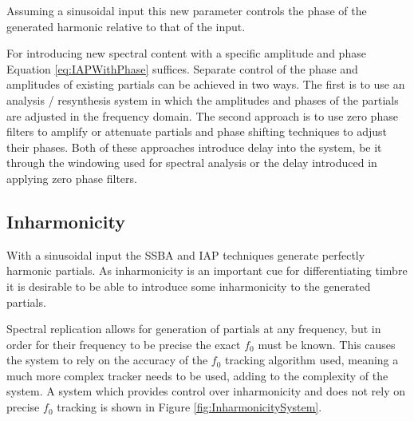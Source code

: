 		Assuming a sinusoidal input this new parameter controls the phase of the generated harmonic relative to
		that of the input. 
		
		For introducing new spectral content with a specific amplitude and phase Equation \ref{eq:IAPWithPhase}
		suffices. Separate control of the phase and amplitudes of existing partials can be achieved in two ways.
		The first is to use an analysis / resynthesis system in which the amplitudes and phases of the partials are
		adjusted in the frequency domain. The second approach is to use zero phase filters to amplify or attenuate
		partials and phase shifting techniques to adjust their phases. Both of these approaches introduce delay
		into the system, be it through the windowing used for spectral analysis or the delay introduced in applying
		zero phase filters.

	\subsection{Inharmonicity}
	\label{sec:FeatureControl-Systems-Inharmonicity}
		With a sinusoidal input the SSBA and IAP techniques generate perfectly harmonic partials. As inharmonicity
		is an important cue for differentiating timbre it is desirable to be able to introduce some inharmonicity
		to the generated partials.

		Spectral replication allows for generation of partials at any frequency, but in order for their frequency
		to be precise the exact $f_{0}$ must be known. This causes the system to rely on the accuracy of the
		$f_{0}$ tracking algorithm used, meaning a much more complex tracker needs to be used, adding to the
		complexity of the system. A system which provides control over inharmonicity and does not rely on precise
		$f_{0}$ tracking is shown in Figure \ref{fig:InharmonicitySystem}.

